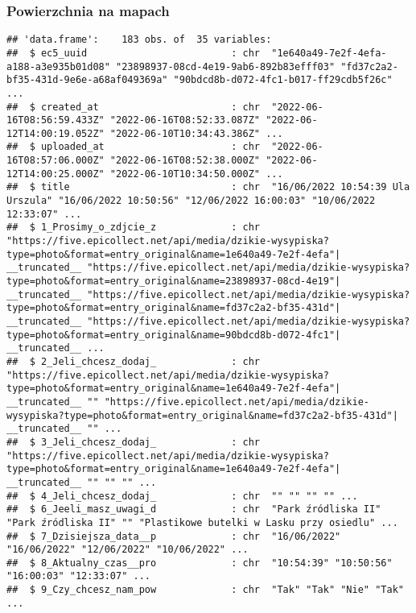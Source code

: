 \documentclass[
]{article}
\begin{document}
\hypertarget{powierzchnia-na-mapach}{%
\subsubsection{Powierzchnia na mapach}\label{powierzchnia-na-mapach}}

\begin{verbatim}
## 'data.frame':    183 obs. of  35 variables:
##  $ ec5_uuid                         : chr  "1e640a49-7e2f-4efa-a188-a3e935b01d08" "23898937-08cd-4e19-9ab6-892b83efff03" "fd37c2a2-bf35-431d-9e6e-a68af049369a" "90bdcd8b-d072-4fc1-b017-ff29cdb5f26c" ...
##  $ created_at                       : chr  "2022-06-16T08:56:59.433Z" "2022-06-16T08:52:33.087Z" "2022-06-12T14:00:19.052Z" "2022-06-10T10:34:43.386Z" ...
##  $ uploaded_at                      : chr  "2022-06-16T08:57:06.000Z" "2022-06-16T08:52:38.000Z" "2022-06-12T14:00:25.000Z" "2022-06-10T10:34:50.000Z" ...
##  $ title                            : chr  "16/06/2022 10:54:39 Ula Urszula" "16/06/2022 10:50:56" "12/06/2022 16:00:03" "10/06/2022 12:33:07" ...
##  $ 1_Prosimy_o_zdjcie_z             : chr  "https://five.epicollect.net/api/media/dzikie-wysypiska?type=photo&format=entry_original&name=1e640a49-7e2f-4efa"| __truncated__ "https://five.epicollect.net/api/media/dzikie-wysypiska?type=photo&format=entry_original&name=23898937-08cd-4e19"| __truncated__ "https://five.epicollect.net/api/media/dzikie-wysypiska?type=photo&format=entry_original&name=fd37c2a2-bf35-431d"| __truncated__ "https://five.epicollect.net/api/media/dzikie-wysypiska?type=photo&format=entry_original&name=90bdcd8b-d072-4fc1"| __truncated__ ...
##  $ 2_Jeli_chcesz_dodaj_             : chr  "https://five.epicollect.net/api/media/dzikie-wysypiska?type=photo&format=entry_original&name=1e640a49-7e2f-4efa"| __truncated__ "" "https://five.epicollect.net/api/media/dzikie-wysypiska?type=photo&format=entry_original&name=fd37c2a2-bf35-431d"| __truncated__ "" ...
##  $ 3_Jeli_chcesz_dodaj_             : chr  "https://five.epicollect.net/api/media/dzikie-wysypiska?type=photo&format=entry_original&name=1e640a49-7e2f-4efa"| __truncated__ "" "" "" ...
##  $ 4_Jeli_chcesz_dodaj_             : chr  "" "" "" "" ...
##  $ 6_Jeeli_masz_uwagi_d             : chr  "Park źródliska II" "Park źródliska II" "" "Plastikowe butelki w Lasku przy osiedlu" ...
##  $ 7_Dzisiejsza_data__p             : chr  "16/06/2022" "16/06/2022" "12/06/2022" "10/06/2022" ...
##  $ 8_Aktualny_czas__pro             : chr  "10:54:39" "10:50:56" "16:00:03" "12:33:07" ...
##  $ 9_Czy_chcesz_nam_pow             : chr  "Tak" "Tak" "Nie" "Tak" ...

\end{verbatim}
\end{document}
